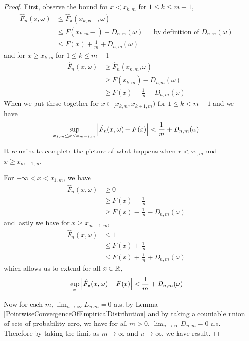 \begin{proof}
First, observe the bound for $x < x_{k,m}$ for $1 \leq k \leq m-1$, 
\begin{align*}
\hat{F}_n(x, \omega) &\leq \hat{F}_n(x_{k,m}-, \omega) \\
&\leq F(x_{k,m}-) + D_{n,m}(\omega) & &\text{by definition of
  $D_{n,m}(\omega)$} \\
&\leq F(x) + \frac{1}{m} + D_{n,m}(\omega)
\end{align*}
and for $x \geq x_{k,m}$ for $1 \leq k \leq m-1$
\begin{align*}
\hat{F}_n(x, \omega) &\geq \hat{F}_n(x_{k,m}, \omega) \\
&\geq F(x_{k,m}) - D_{n,m}(\omega) \\
&\geq F(x) - \frac{1}{m}  - D_{n,m}(\omega) 
\end{align*}
When we put these together for $x \in [x_{k,m}, x_{k+1,m})$ for $1\leq
k < m-1$ and we have 
\begin{align*}
\sup_{x_{1,m} \leq x < x_{m-1,m}} \left \vert \hat{F}_n(x, \omega) - F(x) \right \vert < \frac{1}{m} + D_{n,m}(\omega)
\end{align*}

It remains to complete the picture of what happens when $x < x_{1,m}$ and $x \geq
x_{m-1,m}$.

For $-\infty < x < x_{1,m}$, we have 
\begin{align*}
\hat{F}_n(x, \omega) & \geq 0 \\
& \geq F(x) - \frac{1}{m} \\
&  \geq F(x) - \frac{1}{m} - D_{n,m}(\omega)
\end{align*}
and lastly we have for $x \geq x_{m-1,m}$, 
\begin{align*}
\hat{F}_n(x, \omega) &\leq 1 \\
&\leq F(x) + \frac{1}{m} \\
&\leq F(x) + \frac{1}{m} + D_{n,m}(\omega)
\end{align*}
which allows us to extend for all $x \in \mathbb{R}$,
\begin{align*}
\sup_{x} \left \vert \hat{F}_n(x, \omega) - F(x) \right \vert < \frac{1}{m} + D_{n,m}(\omega)
\end{align*}

Now for each $m$, $\lim_{n \to \infty} D_{n,m} = 0$ a.s. by Lemma
\ref{PointwiseConvergenceOfEmpiricalDistribution}
and by taking a countable union of sets of probability zero, we have
for all $m > 0$, $\lim_{n \to \infty} D_{n,m} = 0$ a.s.  Therefore by
taking the limit as $m \to \infty$ and $n \to \infty$, we have result.
\end{proof}

